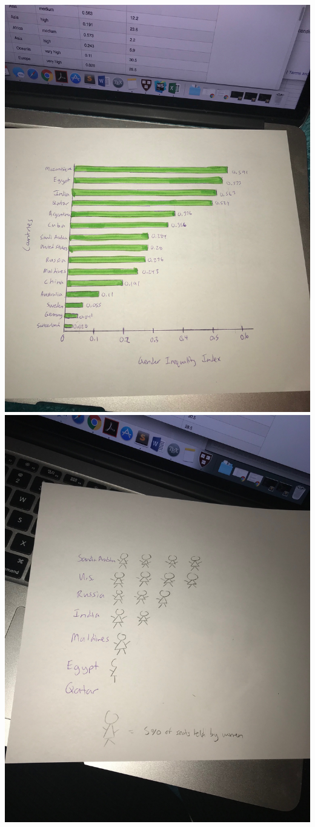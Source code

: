 \documentclass[11pt]{article}
\begin{document}
\begin{enumerate}
  \includegraphics[scale=0.15]{sketch1}
  \includegraphics[scale=0.15]{sketch2}

\end{enumerate}
\end{document}
